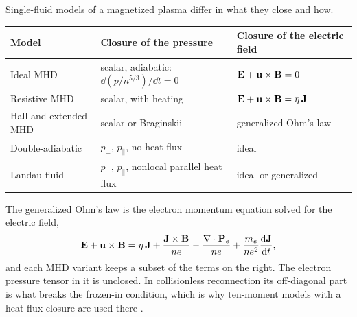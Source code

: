 Single-fluid models of a magnetized plasma differ in what they close and
how.
\begin{center}
\renewcommand{\arraystretch}{1.3}
\begin{tabularx}{\textwidth}{@{}P{3.3cm}P{5.0cm}Y@{}}
\toprule
Model & Closure of the pressure & Closure of the electric field \\
\midrule
Ideal MHD & scalar, adiabatic: $\dd(p/n^{5/3})/\dd t=0$
  & $\mathbf{E}+\mathbf{u}\times\mathbf{B}=0$ \\
Resistive MHD & scalar, with heating
  & $\mathbf{E}+\mathbf{u}\times\mathbf{B}=\eta\,\mathbf J$ \\
Hall and extended MHD & scalar or Braginskii
  & generalized Ohm's law \\
Double-adiabatic & $p_\perp$, $p_\parallel$, no heat flux & ideal \\
Landau fluid & $p_\perp$, $p_\parallel$, nonlocal parallel heat flux
  & ideal or generalized \\
\bottomrule
\end{tabularx}
\end{center}
The generalized Ohm's law is the electron momentum equation solved for the
electric field,
\begin{equation}
  \mathbf{E}+\mathbf{u}\times\mathbf{B}=\eta\,\mathbf J+\frac{\mathbf J\times\mathbf{B}}{ne}
   -\frac{\nabla\cdot\mathbf P_e}{ne}
   +\frac{m_e}{ne^2}\frac{\mathrm{d}\mathbf J}{\mathrm{d} t},
\end{equation}
and each MHD variant keeps a subset of the terms on the right. The
electron pressure tensor in it is unclosed. In collisionless reconnection
its off-diagonal part is what breaks the frozen-in condition, which is why
ten-moment models with a heat-flux closure are used there \cite{Wang15}.
